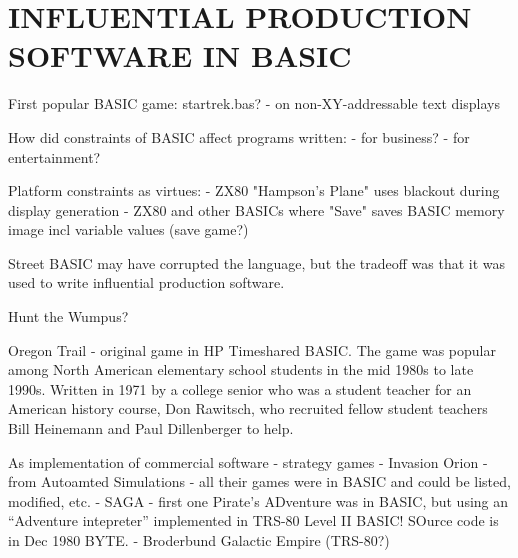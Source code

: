 

\section{INFLUENTIAL PRODUCTION SOFTWARE IN BASIC}

First popular BASIC game: startrek.bas?
  - on non-XY-addressable text displays


How did constraints of BASIC affect programs written:
- for business?
- for entertainment?



Platform constraints as virtues:
 - ZX80 "Hampson's Plane" uses blackout during display generation 
 - ZX80 and other BASICs where "Save" saves BASIC memory image incl
 variable values (save game?)



Street BASIC may have corrupted the language, but the tradeoff was that
it was used to write influential production software.


Hunt the Wumpus?


Oregon Trail - original game in HP Timeshared BASIC.  The game was popular among
North American elementary school students in the mid 1980s to late
1990s.  Written  in 1971 by a college senior who was a student teacher for an
American history course, Don Rawitsch, who recruited fellow student
teachers Bill Heinemann and Paul Dillenberger to help.

As implementation of commercial software - strategy games
  - Invasion Orion - from Autoamted Simulations - all their games were
  in BASIC and could be listed, modified, etc.
  - SAGA - first one Pirate's ADventure was in BASIC, but using an
  ``Adventure intepreter'' implemented in TRS-80 Level II BASIC!  SOurce
  code is in Dec 1980 BYTE.
  - Broderbund Galactic Empire (TRS-80?)


